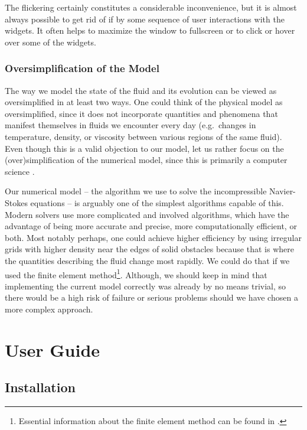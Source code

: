 \documentclass[11pt,a4paper,twoside,openright]{report}
\begin{document}
The flickering certainly constitutes a considerable inconvenience, but it is almost always possible to get rid of if by some sequence of user interactions with the widgets. It often helps to maximize the window to fullscreen or to click or hover over some of the widgets.

\subsection{Oversimplification of the Model}
The way we model the state of the fluid and its evolution can be viewed as oversimplified in at least two ways. One could think of the physical model as oversimplified, since it does not incorporate quantities and phenomena that manifest themselves in fluids we encounter every day (e.g.\ changes in temperature, density, or viscosity between various regions of the same fluid). Even though this is a valid objection to our model, let us rather focus on the (over)simplification of the numerical model, since this \this{} is primarily a computer science \this{}.

Our numerical model -- the algorithm we use to solve the incompressible Navier-Stokes equations -- is arguably one of the simplest algorithms capable of this. Modern solvers use more complicated and involved algorithms, which have the advantage of being more accurate and precise, more computationally efficient, or both. Most notably perhaps, one could achieve higher efficiency by using irregular grids with higher density near the edges of solid obstacles because that is where the quantities describing the fluid change most rapidly. We could do that if we used the finite element method\footnote{Essential information about the finite element method can be found in \cite{WikiFEM}.}. Although, we should keep in mind that implementing the current model correctly was already by no means trivial, so there would be a high risk of failure or serious problems should we have chosen a more complex approach.


\chapter{User Guide}

\section{Installation}
\end{document}
